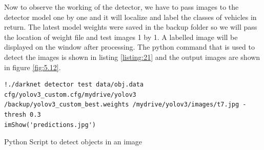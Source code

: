 Now to observe the working of the detector, we have to pass images to the detector model one by one and it will localize and label the classes of vehicles in return. The latest model weights were saved in the backup folder so we will pass the location of weight file and test images 1 by 1. A labelled image will be displayed on the window after processing. The python command that is used to detect the images is shown in listing \ref{listing:21} and the output images are shown in figure \ref{fig:5.12}.
\begin{longlisting}
\begin{verbatim}
!./darknet detector test data/obj.data cfg/yolov3_custom.cfg/mydrive/yolov3
/backup/yolov3_custom_best.weights /mydrive/yolov3/images/t7.jpg -thresh 0.3
imShow('predictions.jpg')
\end{verbatim}
\caption{Python Script to detect objects in an image}
\label{listing:21}
\end{longlisting}
